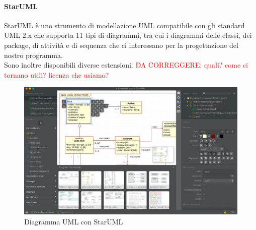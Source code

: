 		\paragraph{StarUML}
		\label{sec:StarUML}
		\Spazio
		StarUML è uno strumento di modellazione UML compatibile con gli standard UML 2.x che supporta 11 tipi di diagrammi, tra cui i diagrammi delle classi, dei package, di attività e di sequenza che ci interessano per la progettazione del nostro programma.\\
		Sono inoltre disponibili diverse estensioni. \textcolor{red}{DA CORREGGERE: quali? come ci tornano utili? licenza che usiamo?}
		\begin{figure}[h]
		\label{figuraStarUML}
		\centering 
		\includegraphics[width=1\textwidth]{images/starUML.png}
		\caption{Diagramma UML con StarUML} %
		\end{figure}

		
